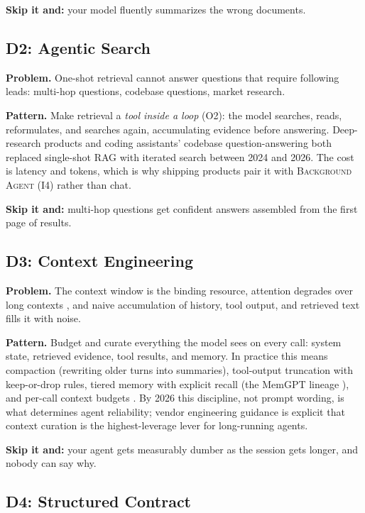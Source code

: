 \documentclass[11pt]{article}
\newcommand{\pat}[1]{\textsc{#1}}
\begin{document}
\textbf{Skip it and:} your model fluently summarizes the wrong documents.

\subsection{D2: Agentic Search}

\textbf{Problem.} One-shot retrieval cannot answer questions that require
following leads: multi-hop questions, codebase questions, market research.

\textbf{Pattern.} Make retrieval a \emph{tool inside a loop} (O2): the model
searches, reads, reformulates, and searches again, accumulating evidence
before answering. Deep-research products and coding assistants' codebase
question-answering both replaced single-shot RAG with iterated search between
2024 and 2026. The cost is latency and tokens, which is why shipping products
pair it with \pat{Background Agent} (I4) rather than chat.

\textbf{Skip it and:} multi-hop questions get confident answers assembled from
the first page of results.

\subsection{D3: Context Engineering}

\textbf{Problem.} The context window is the binding resource, attention
degrades over long contexts \citep{liu2024lost}, and naive accumulation of
history, tool output, and retrieved text fills it with noise.

\textbf{Pattern.} Budget and curate everything the model sees on every call:
system state, retrieved evidence, tool results, and memory. In practice this
means compaction (rewriting older turns into summaries), tool-output
truncation with keep-or-drop rules, tiered memory with explicit
recall (the MemGPT lineage \citep{packer2023memgpt}), and per-call context
budgets \citep{anthropic2025context, sourcegraph2026context}. By 2026 this
discipline, not prompt wording, is what determines agent reliability; vendor
engineering guidance is explicit that context curation is the
highest-leverage lever for long-running agents.

\textbf{Skip it and:} your agent gets measurably dumber as the session gets
longer, and nobody can say why.

\subsection{D4: Structured Contract}
\end{document}
